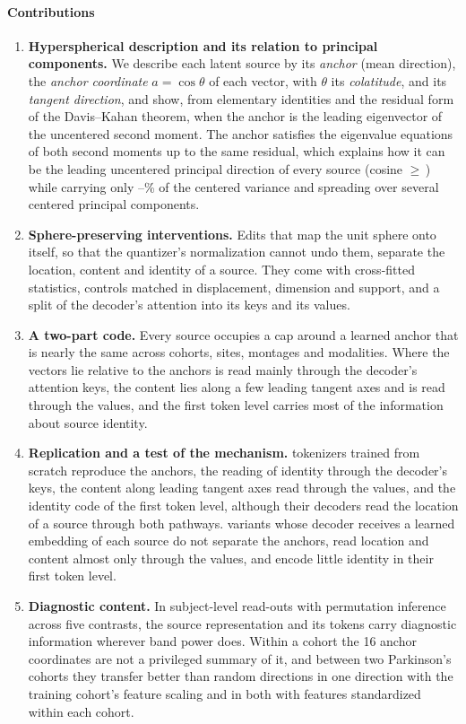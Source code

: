 \documentclass[10pt,letterpaper]{article}
\begin{document}
\paragraph*{Contributions}
\begin{enumerate}
\item \textbf{Hyperspherical description and its relation to principal components.} We describe
  each latent source by its \emph{anchor} (mean direction), the \emph{anchor coordinate}
  $a=\cos\theta$ of each vector, with $\theta$ its \emph{colatitude}, and its \emph{tangent
  direction}, and show, from elementary identities and the residual form of the Davis--Kahan theorem,
  when the anchor is the leading eigenvector of the uncentered second moment.
  The anchor satisfies the eigenvalue equations of both second moments up to the same residual,
  which explains how it can be the leading uncentered principal direction of every source (cosine
  $\geq$\,\CosUncMin) while carrying only \AnchorVarFracMin--\AnchorVarFracMax\% of the centered
  variance and spreading over several centered principal components.
\item \textbf{Sphere-preserving interventions.} Edits that map the unit sphere onto itself, so that
  the quantizer's normalization cannot undo them, separate the location, content and identity of a
  source. They come with cross-fitted statistics, controls matched in displacement, dimension and
  support, and a split of the decoder's attention into its keys and its values.
\item \textbf{A two-part code.} Every source occupies a cap around a learned anchor that is nearly the
  same across cohorts, sites, montages and modalities. Where the vectors lie relative to the anchors
  is read mainly through the decoder's attention keys, the content lies along a few leading tangent
  axes and is read through the values, and the first token level carries most of the information
  about source identity.
\item \textbf{Replication and a test of the mechanism.} \NumSeedReplicas{} tokenizers trained from
  scratch reproduce the anchors, the reading of identity through the decoder's keys, the content
  along leading tangent axes read through the values, and the identity code of the first token level,
  although their decoders read the location of a source through both pathways. \VariantCountCap{}
  variants whose decoder receives a learned embedding of each source do not separate the anchors,
  read location and content almost only through the values, and encode little identity in their
  first token level.

\item \textbf{Diagnostic content.} In subject-level read-outs with permutation
  inference across five contrasts, the source representation and its tokens carry diagnostic
  information wherever band power does. Within a cohort the 16 anchor coordinates are not a
  privileged summary of it, and between two Parkinson's cohorts they transfer better than random
  directions in one direction with the training cohort's feature scaling and in both with features
  standardized within each cohort.

\end{enumerate}
\end{document}
